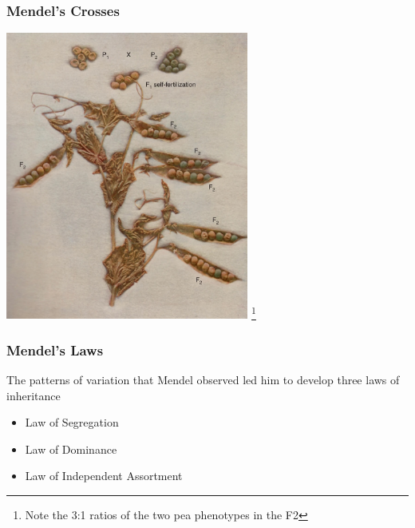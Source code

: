 \documentclass{beamer}
\newcommand\blfootnote[1]{%
	\begingroup
	\renewcommand\thefootnote{}\footnote{#1}%
	\addtocounter{footnote}{-1}%
	\endgroup
}
\begin{document}
\begin{frame}
	
	\frametitle{Mendel's Crosses}
\begin{center}
				\includegraphics[keepaspectratio, width  =0.6\textwidth]{img/crossedPeas}
				\blfootnote{Note the 3:1 ratios of the two pea phenotypes in the F2}
	
	
\end{center}
\end{frame}


\begin{frame}
	
	\frametitle{Mendel's Laws}

The patterns of variation that Mendel observed led him to develop three laws of inheritance
\begin{itemize}
	\item Law of Segregation 
	\item Law of Dominance 
	\item Law of Independent Assortment
		\end{itemize}
	\end{frame}



\end{document}
